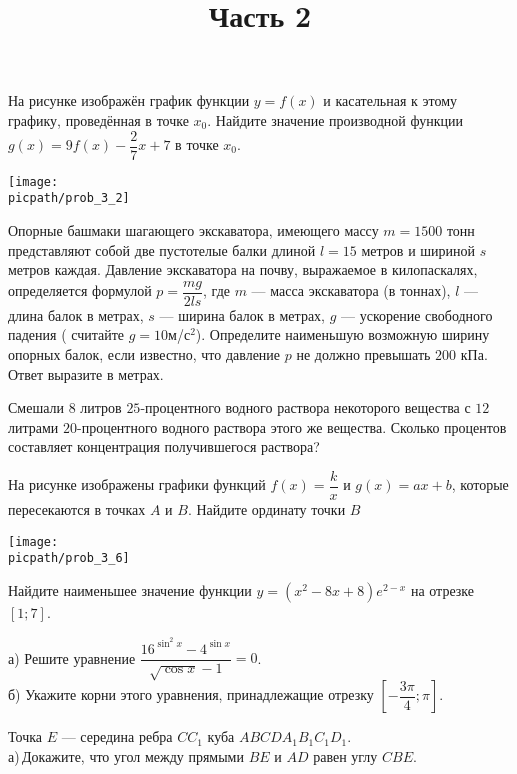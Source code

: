 \begin{training}[2]
\begin{listofex}
		На рисунке изображён график функции \( y=f(x) \) и касательная к этому графику, проведённая в точке \( x_0 \). Найдите значение производной функции \( g(x)=9f(x)-\dfrac{2}{7}x+7 \) в точке \( x_0 \).
		\begin{center}
			\texttt{[image: \\picpath/prob\_3\_2]}
		\end{center}
		\foranswer
		\item Опорные башмаки шагающего экскаватора, имеющего массу \( m=1500 \) тонн представляют собой две пустотелые балки длиной \( l=15 \) метров и шириной \( s \) метров каждая. Давление экскаватора на почву, выражаемое в килопаскалях, определяется формулой \( p=\dfrac{mg}{2ls} \), где \( m \) --- масса экскаватора (в тоннах), \( l \) ---длина балок в метрах, \( s \) --- ширина балок в метрах, \( g \) --- ускорение свободного падения ( считайте \( g=10 \)м/с\( ^2 \)). Определите наименьшую возможную ширину опорных балок, если известно, что давление \( p \) не должно превышать \( 200 \) кПа. Ответ выразите в метрах.
		\foranswer
		\item Смешали \( 8 \) литров \( 25 \)-процентного водного раствора некоторого вещества с \( 12 \) литрами \( 20 \)-процентного водного раствора этого же вещества. Сколько процентов составляет концентрация получившегося раствора?
		\foranswer
		\newpage
		\hphantom{Часть 1}
		\item 
		На рисунке изображены графики функций \( f(x)=\dfrac{k}{x} \) и \( g(x)=ax+b \), которые пересекаются в точках \( A \) и \( B \). Найдите ординату точки \( B \)
		\begin{center}
			\texttt{[image: \\picpath/prob\_3\_6]}
		\end{center}
		\foranswer
		\item Найдите наименьшее значение функции \( y=(x^2-8x+8)e^{2-x} \) на отрезке \( \left[ 1; 7\right]  \).
		\foranswer
		\egepreambtwo
		\title{Часть 2}
		\item а) Решите уравнение \( \dfrac{16^{\sin^2x}-4^{\sin x}}{\sqrt{\cos x}-1}=0\). \\
		б) Укажите корни этого уравнения, принадлежащие отрезку \( \left[ -\dfrac{3\pi}{4};\pi \right]  \).
		\newpage
		\hphantom{Часть 1}
		\item Точка \( E \) --- середина ребра \( CC_1 \) куба \( ABCDA_1B_1C_1D_1 \). \\
		а) Докажите, что угол между прямыми \( BE \) и \( AD \) равен углу \( CBE \).\\		

\end{listofex}
\end{training}
